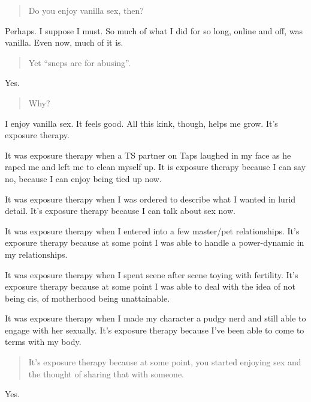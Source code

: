 \begin{quote}
Do you enjoy vanilla sex, then?
\end{quote}

Perhaps. I suppose I must. So much of what I did for so long, online and off, was vanilla. Even now, much of it is.

\begin{quote}
Yet ``sneps are for abusing''.
\end{quote}

Yes.

\begin{quote}
Why?
\end{quote}

I enjoy vanilla sex. It feels good. All this kink, though, helps me grow. It's exposure therapy.

It was exposure therapy when a TS partner on Taps laughed in my face as he raped me and left me to clean myself up. It is exposure therapy because I can say no, because I can enjoy being tied up now.

It was exposure therapy when I was ordered to describe what I wanted in lurid detail. It's exposure therapy because I can talk about sex now.

It was exposure therapy when I entered into a few master/pet relationships. It's exposure therapy because at some point I was able to handle a power-dynamic in my relationships.

It was exposure therapy when I spent scene after scene toying with fertility. It's exposure therapy because at some point I was able to deal with the idea of not being cis, of motherhood being unattainable.

It was exposure therapy when I made my character a pudgy nerd and still able to engage with her sexually. It's exposure therapy because I've been able to come to terms with my body.

\begin{quote}
It's exposure therapy because at some point, you started enjoying sex and the thought of sharing that with someone.
\end{quote}

Yes.
